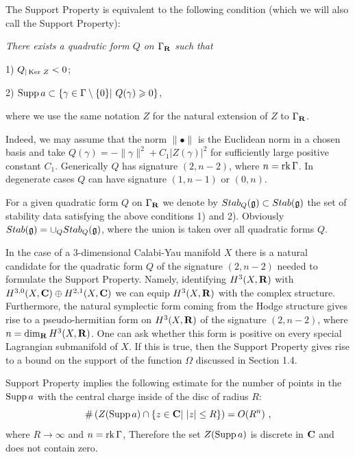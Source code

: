 \documentclass[12pt]{article}
\begin{document}
The Support Property is equivalent to the following condition (which we will also call the Support Property):

{\it There exists a  quadratic form $Q$ on $\Gamma_{{\bf R}}$ such that

1) $Q_{|\operatorname{Ker}\, Z}<0$;

2) $\operatorname{Supp} a\subset \{\gamma\in \Gamma\setminus \{0\}|\,\,Q(\gamma)\geqslant 0\}$,

where we use the same notation $Z$ for the natural extension of $Z$ to $\Gamma_{{\bf R}}$.}

Indeed, we may assume that the norm $\parallel\bullet\parallel$ is the Euclidean norm in a chosen basis and
take $Q(\gamma)=-\parallel\gamma\parallel^2+C_1|Z(\gamma)|^2$ for sufficiently large positive
constant $C_1$. Generically $Q$ has signature $(2,n-2)$, where $n=\operatorname{rk}\Gamma$. In degenerate
cases $Q$ can have signature $(1,n-1)$ or $(0,n)$.

For a given quadratic form $Q$ on $\Gamma_{{\bf R}}$ we denote by $Stab_Q({\mathfrak g})\subset Stab({\mathfrak g})$ the set of stability data satisfying the above conditions 1) and 2). Obviously $Stab({\mathfrak g})=\cup_QStab_Q({\mathfrak g})$, where the union is taken over all quadratic forms $Q$.

\begin{rmk}
In the case of a $3$-dimensional Calabi-Yau manifold $X$ there is a natural candidate for the quadratic
form $Q$ of the signature $(2,n-2)$ needed to formulate the Support Property.
Namely, identifying $H^3(X,{\bf R})$ with $H^{3,0}(X,{\bf C})\oplus H^{2,1}(X,{\bf C})$ we can equip $H^3(X,{\bf R})$
with the complex structure. Furthermore, the natural symplectic form coming from the Hodge structure gives rise to a pseudo-hermitian
form on $H^3(X,{\bf R})$ of the signature $(2,n-2)$, where $n=\dim _{{\bf R}}H^3(X,{\bf R})$. One can ask whether 
 this form is positive on every special Lagrangian submanifold of $X$. If this is true, then
the Support Property gives rise to a bound on the support of the function $\Omega$ discussed in Section 1.4.
\end{rmk}




Support Property implies the following estimate for the number of points in the $\operatorname{Supp}a$ with the central charge
inside of the disc of radius $R$:
$$\#\left(Z(\operatorname{Supp}a)\cap \{z\in {\bf C}|\,\,|z|\le R\}\right)=O(R^n)\,\,,$$
where $R\to \infty$ and $n=\operatorname{rk}\Gamma$, Therefore the set $Z(\operatorname{Supp}a)$ is discrete in ${\bf C}$
and does not contain zero.
\end{document}
